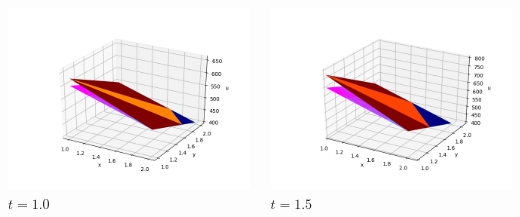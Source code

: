 \documentclass[]{beamer}
\begin{document}
\begin{frame}[t]
\begin{columns}
\begin{center}
			\includegraphics[scale=0.2]{figures/2D_rz_ls1mat_u_vs_x_10}\\
			$t=1.0$
			\end{center}
			\begin{center}
			\includegraphics[scale=0.2]{figures/2D_rz_ls1mat_u_vs_x_15}\\
			\tiny$t=1.5$			
			
			\null
			

\end{center}
\end{columns}
\end{frame}
\end{document}
